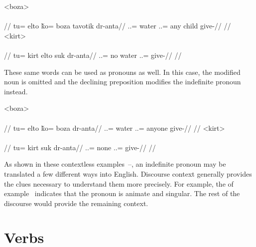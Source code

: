 	\a<boza>\begingl
		\glpreamble{}\\
		\\
		//
		\gla tu= elto ǩo= boza tavotik dr-anta//
		\glb \An.\Sg.\Acc= water \An.\Sg.\Dat= any child give-\Imp//
		\glft{}//
	\endgl
	\a<kirt>\begingl
		\glpreamble{}\\
		\\
		//
		\gla tu= kirt elto suk dr-anta//
		\glb \An.\Sg.\Acc= no water \Tps.\An.\Dat= give-\Imp//
		\glft{}//
	\endgl
\xe

These same words can be used as pronouns as well. In this case, the modified noun is omitted and the declining preposition modifies the indefinite pronoun instead.

	\a<boza>\begingl
		\glpreamble{}\\
		\\
		//
		\gla tu= elto ǩo= boza dr-anta//
		\glb \An.\Sg.\Acc= water \An.\Sg.\Dat= anyone give-\Imp//
		\glft{}//
		\endgl
	\a<kirt>\begingl
		\glpreamble{}\\
		\\
		//
		\gla tu= kirt suk dr-anta//
		\glb \An.\Sg.\Acc= none \Tps.\An.\Dat= give-\Imp//
		\glft{}//
	\endgl
\xe

As shown in these contextless examples~–, an indefinite pronoun may be translated a few different ways into English. Discourse context generally provides the clues necessary to understand them more precisely. For example, the  of example~ indicates that the pronoun  is animate and singular. The rest of the discourse would provide the remaining context.

\section{Verbs}
\label{sec:tvk-verbs}

